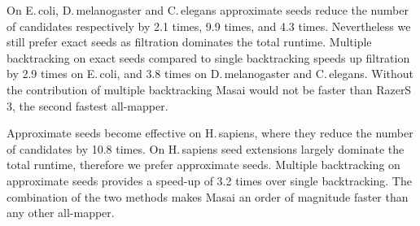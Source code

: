 On E.\,coli, D.\,melanogaster and C.\,elegans approximate seeds reduce the number of candidates respectively by 2.1 times, 9.9 times, and 4.3 times.
Nevertheless we still prefer exact seeds as filtration dominates the total runtime.
Multiple backtracking on exact seeds compared to single backtracking speeds up filtration by 2.9 times on E.\,coli, and 3.8 times on D.\,melanogaster and C.\,elegans.
Without the contribution of multiple backtracking Masai would not be faster than RazerS\,3, the second fastest all-mapper.

Approximate seeds become effective on H.\,sapiens, where they reduce the number of candidates by 10.8 times. 
On H.\,sapiens seed extensions largely dominate the total runtime, therefore we prefer approximate seeds.
Multiple backtracking on approximate seeds provides a speed-up of 3.2 times over single backtracking.
The combination of the two methods makes Masai an order of magnitude faster than any other all-mapper.

